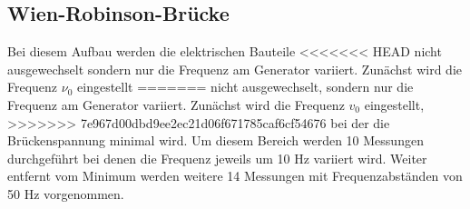 \subsection{Wien-Robinson-Brücke}
Bei diesem Aufbau werden die elektrischen Bauteile
<<<<<<< HEAD
nicht ausgewechselt sondern nur die Frequenz am 
Generator variiert. Zunächst wird die Frequenz $\nu_0$ eingestellt
=======
nicht ausgewechselt, sondern nur die Frequenz am 
Generator variiert. Zunächst wird die Frequenz $v_0$ eingestellt,
>>>>>>> 7e967d00dbd9ee2ec21d06f671785caf6cf54676
bei der die Brückenspannung minimal wird. Um diesem Bereich werden
10 Messungen durchgeführt bei denen die Frequenz jeweils um 10 Hz
variiert wird. Weiter entfernt vom Minimum werden weitere 14 Messungen
mit Frequenzabständen von 50 Hz vorgenommen.

